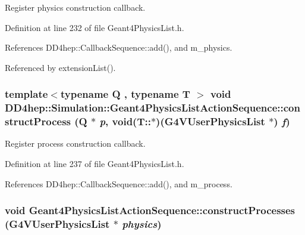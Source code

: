 Register physics construction callback. 

Definition at line 232 of file Geant4PhysicsList.h.

References DD4hep::CallbackSequence::add(), and m\_\-physics.

Referenced by extensionList().\hypertarget{class_d_d4hep_1_1_simulation_1_1_geant4_physics_list_action_sequence_a415ec49dc9c79e44e52c3c99901e7e32}{
\subsubsection[{constructProcess}]{\setlength{\rightskip}{0pt plus 5cm}template$<$typename Q , typename T $>$ void DD4hep::Simulation::Geant4PhysicsListActionSequence::constructProcess (Q $\ast$ {\em p}, \/  void(T::$\ast$)(G4VUserPhysicsList $\ast$) {\em f})}}
\label{class_d_d4hep_1_1_simulation_1_1_geant4_physics_list_action_sequence_a415ec49dc9c79e44e52c3c99901e7e32}


Register process construction callback. 

Definition at line 237 of file Geant4PhysicsList.h.

References DD4hep::CallbackSequence::add(), and m\_\-process.\hypertarget{class_d_d4hep_1_1_simulation_1_1_geant4_physics_list_action_sequence_a752ad9266718451f2a6b4906a395cbb7}{
\subsubsection[{constructProcesses}]{\setlength{\rightskip}{0pt plus 5cm}void Geant4PhysicsListActionSequence::constructProcesses (G4VUserPhysicsList $\ast$ {\em physics})}}
\label{class_d_d4hep_1_1_simulation_1_1_geant4_physics_list_action_sequence_a752ad9266718451f2a6b4906a395cbb7}


